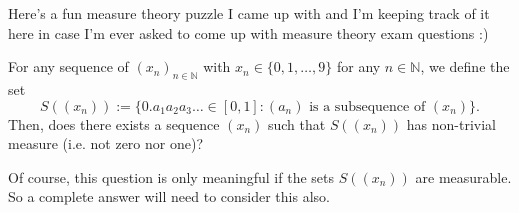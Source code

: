 \documentclass{article}
\begin{document}
Here's a fun measure theory puzzle I came up with and I'm keeping track of it here in case I'm ever 
asked to come up with measure theory exam questions :)

For any sequence of \((x_n)_{n \in \mathbb{N}}\) with \(x_n \in \{0, 1, \dots, 9\}\) for any \(n \in \mathbb{N}\), 
we define the set 
\[S((x_n)) := \{0.a_1a_2a_3\ldots \in [0, 1] : (a_n) \text{ is a subsequence of } (x_n)\}.\]
Then, does there exists a sequence \((x_n)\) such that \(S((x_n))\) has non-trivial measure (i.e. not zero nor one)?

Of course, this question is only meaningful if the sets \(S((x_n))\) are measurable. So a complete 
answer will need to consider this also.
\end{document}
